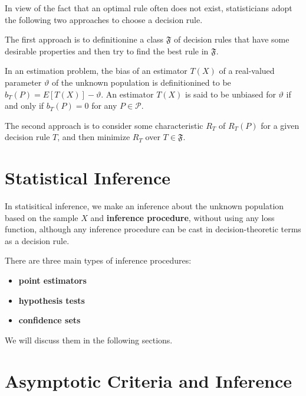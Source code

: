 In view of the fact that an optimal rule often does not exist, statisticians adopt the following two approaches to choose a decision rule.\par
The first approach is to definitionine a class $\mathfrak{F}$ of decision rules that have some desirable properties and then try to find the best rule in $\mathfrak{F}$.
\begin{definition}[bias]
In an estimation problem, the bias of an estimator $T(X)$ of a real-valued parameter $\vartheta$ of the unknown population is definitionined to be $b_T(P)=E[T(X)]-\vartheta$. An estimator $T(X)$ is said to be unbiased for $\vartheta$ if and only if $b_T(P)=0$ for any $P\in\mathcal{P}$.
\end{definition}
\begin{definition}[invariance]

\end{definition}
The second approach is to consider some characteristic $R_T$ of $R_T(P)$ for a given decision rule $T$, and then minimize $R_T$ over $T\in\mathfrak{F}$.
\section{Statistical Inference}
In statisitical inference, we make an inference about the unknown population based on the sample $X$ and \textbf{inference procedure}, without using any loss function, although any inference procedure can be cast in decision-theoretic terms as a decision rule.\par
There are three main types of inference procedures: 
\begin{itemize}
\item \textbf{point estimators}
\item \textbf{hypothesis tests}
\item \textbf{confidence sets}
\end{itemize}
We will discuss them in the following sections.


\section{Asymptotic Criteria and Inference}
